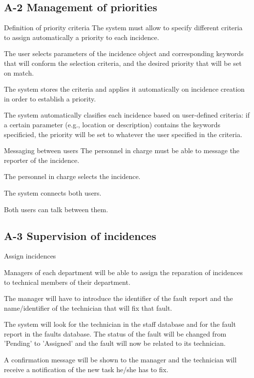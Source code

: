 \subsection{A-2 Management of priorities}
\begin{requirement}{Definition of priority criteria}
\reqdesc The system must allow to specify different criteria to assign automatically a priority to each incidence.

\reqin The user selects parameters of the incidence object and corresponding keywords that will conform the selection criteria, and the desired priority that will be set on match.

\reqsteps The system stores the criteria and applies it automatically on incidence creation in order to establish a priority.

\reqout The system automatically clasifies each incidence based on user-defined criteria: if a certain parameter (e.g., location or description) contains the keywords specificied, the priority will be set to whatever the user specified in the criteria.
\end{requirement}


\begin{requirement}{Messaging between users}
\reqdesc The personnel in charge must be able to message the reporter of the incidence.

\reqin The personnel in charge selects the incidence.

\reqsteps The system connects both users.

\reqout Both users can talk between them.
\end{requirement}


\subsection{A-3 Supervision of incidences}
\begin{requirement}{Assign incidences}

\reqdesc Managers of each department will be able to assign the reparation of incidences to technical members of their department.

\reqin The manager will have to introduce the identifier of the fault report and the name/identifier of the technician that will fix that fault.

\reqsteps The system will look for the technician in the staff database and for the fault report in the faults database. The status of the fault will be changed from 'Pending' to 'Assigned' and the fault will now be related to its technician.

\reqout A confirmation message will be shown to the manager and the technician will receive a notification of the new task he/she has to fix.

\end{requirement}


